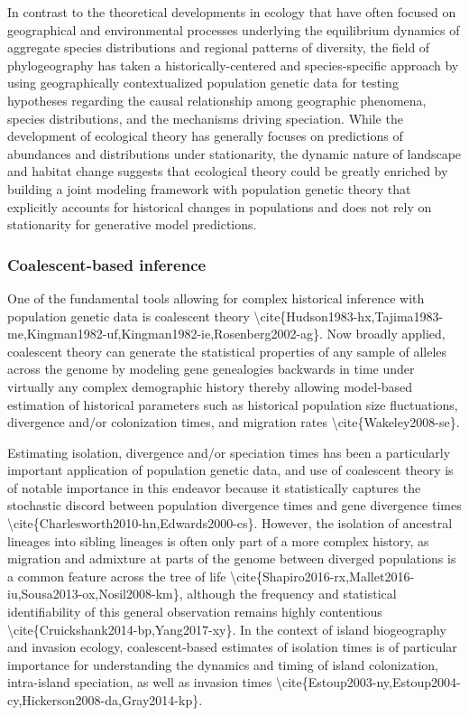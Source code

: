 \documentclass[]{article}
\begin{document}
In contrast to the theoretical developments in ecology that have often
focused on geographical and environmental processes underlying the
equilibrium dynamics of aggregate species distributions and regional
patterns of diversity, the field of phylogeography has taken a
historically-centered and species-specific approach by using
geographically contextualized population genetic data for testing
hypotheses regarding the causal relationship among geographic phenomena,
species distributions, and the mechanisms driving speciation. While the
development of ecological theory has generally focuses on predictions of
abundances and distributions under stationarity, the dynamic nature of
landscape and habitat change suggests that ecological theory could be
greatly enriched by building a joint modeling framework with population
genetic theory that explicitly accounts for historical changes in
populations and does not rely on stationarity for generative model
predictions.

\subsubsection{Coalescent-based
inference}\label{coalescent-based-inference}

One of the fundamental tools allowing for complex historical inference
with population genetic data is coalescent theory
\textbackslash{}cite\{Hudson1983-hx,Tajima1983-me,Kingman1982-uf,Kingman1982-ie,Rosenberg2002-ag\}.
Now broadly applied, coalescent theory can generate the statistical
properties of any sample of alleles across the genome by modeling gene
genealogies backwards in time under virtually any complex demographic
history thereby allowing model-based estimation of historical parameters
such as historical population size fluctuations, divergence and/or
colonization times, and migration rates
\textbackslash{}cite\{Wakeley2008-se\}.

Estimating isolation, divergence and/or speciation times has been a
particularly important application of population genetic data, and use
of coalescent theory is of notable importance in this endeavor because
it statistically captures the stochastic discord between population
divergence times and gene divergence times
\textbackslash{}cite\{Charlesworth2010-hn,Edwards2000-cs\}. However, the
isolation of ancestral lineages into sibling lineages is often only part
of a more complex history, as migration and admixture at parts of the
genome between diverged populations is a common feature across the tree
of life
\textbackslash{}cite\{Shapiro2016-rx,Mallet2016-iu,Sousa2013-ox,Nosil2008-km\},
although the frequency and statistical identifiability of this general
observation remains highly contentious
\textbackslash{}cite\{Cruickshank2014-bp,Yang2017-xy\}. In the context
of island biogeography and invasion ecology, coalescent-based estimates
of isolation times is of particular importance for understanding the
dynamics and timing of island colonization, intra-island speciation, as
well as invasion times
\textbackslash{}cite\{Estoup2003-ny,Estoup2004-cy,Hickerson2008-da,Gray2014-kp\}.
\end{document}
